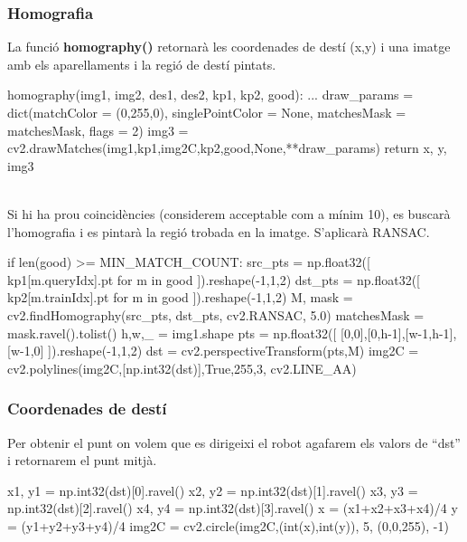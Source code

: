 		\subsubsection{Homografia}
La funció \textbf{homography()} retornarà les coordenades de destí (x,y) i una imatge amb els aparellaments i la regió de destí pintats.\\
		\begin{python}
homography(img1, img2, des1, des2, kp1, kp2, good):
	...
	draw_params = dict(matchColor = (0,255,0), singlePointColor = None,
		matchesMask = matchesMask, flags = 2)
	img3 = cv2.drawMatches(img1,kp1,img2C,kp2,good,None,**draw_params)
	return x, y, img3
		\end{python}
\noindent
\\{}
Si hi ha prou coincidències (considerem acceptable com a mínim 10), es buscarà l'homografia i es pintarà la regió trobada en la imatge. S'aplicarà RANSAC. \\
		\begin{python}
	if len(good) >= MIN_MATCH_COUNT:
		src_pts = np.float32([ kp1[m.queryIdx].pt for m in good ]).reshape(-1,1,2)
		dst_pts = np.float32([ kp2[m.trainIdx].pt for m in good ]).reshape(-1,1,2)
		M, mask = cv2.findHomography(src_pts, dst_pts, cv2.RANSAC, 5.0)
		matchesMask = mask.ravel().tolist()
		h,w,_ = img1.shape
		pts = np.float32([ [0,0],[0,h-1],[w-1,h-1],[w-1,0] ]).reshape(-1,1,2)
		dst = cv2.perspectiveTransform(pts,M)
		img2C = cv2.polylines(img2C,[np.int32(dst)],True,255,3, cv2.LINE_AA)
		\end{python}

		\subsubsection{Coordenades de destí}
Per obtenir el punt on volem que es dirigeixi el robot agafarem els valors de ``dst'' i retornarem el punt mitjà.\\
		\begin{python}
		x1, y1 = np.int32(dst)[0].ravel()
		x2, y2 = np.int32(dst)[1].ravel()
		x3, y3 = np.int32(dst)[2].ravel()
		x4, y4 = np.int32(dst)[3].ravel()
		x = (x1+x2+x3+x4)/4
		y = (y1+y2+y3+y4)/4
		img2C = cv2.circle(img2C,(int(x),int(y)), 5, (0,0,255), -1)
		\end{python}

\newpage
